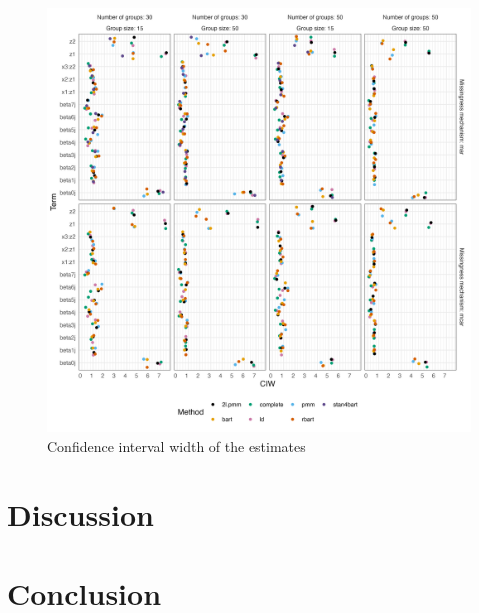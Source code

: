 \documentclass[10pt, a4paper, titlepage]{article}
\begin{document}
\begin{figure}[H]
    \centering
    \label{fig:ciw}
    \includegraphics[width=1\textwidth]{ciw.png}
    \caption{Confidence interval width of the estimates}
\end{figure}

\section{Discussion}

\section{Conclusion}

\newpage
\end{document}
